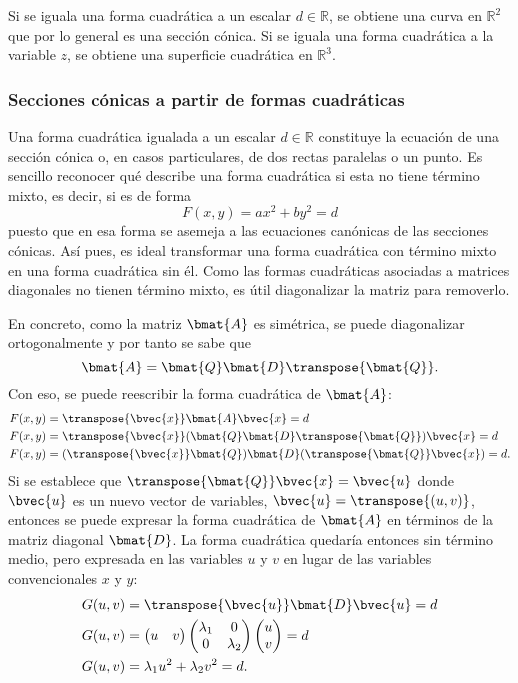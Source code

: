 \documentclass{fmbnotes}
\begin{document}
Si se iguala una forma cuadrática a un escalar \(d \in \mathbb{R}\), se obtiene una curva en \(\mathbb{R}^{2}\) que por lo general es una sección cónica. Si se iguala una forma cuadrática a la variable \(z\), se  obtiene una superficie cuadrática en \(\mathbb{R}^{3}\).

\subsubsection{Secciones cónicas a partir de formas cuadráticas}

Una forma cuadrática igualada a un escalar \(d \in \mathbb{R}\) constituye la ecuación de una sección cónica o, en casos particulares, de dos rectas paralelas o un punto. Es sencillo reconocer qué describe una forma cuadrática si esta no tiene término mixto, es decir, si es de forma 
\[F(x,y)=ax^2+by^2=d\]
puesto que en esa forma se asemeja a las ecuaciones canónicas de las secciones cónicas. Así pues, es ideal transformar una forma cuadrática con término mixto en una forma cuadrática sin él. Como las formas cuadráticas asociadas a matrices diagonales no tienen término mixto, es útil diagonalizar la matriz para removerlo. 

En concreto, como la matriz \(\bmat{A}\) es simétrica, se puede diagonalizar ortogonalmente  y por tanto se sabe que 
\[\bmat{A}=\bmat{Q}\bmat{D}\transpose{\bmat{Q}}.\]
Con eso, se puede reescribir la forma cuadrática de \(\bmat{A}\):  
\begin{align*}
	F(x,y)&=\transpose{\bvec{x}}\bmat{A}\bvec{x} = d \\
	F(x,y) &= \transpose{\bvec{x}}(\bmat{Q}\bmat{D}\transpose{\bmat{Q}})\bvec{x} = d \\
	F(x,y) &= (\transpose{\bvec{x}}\bmat{Q})\bmat{D}(\transpose{\bmat{Q}}\bvec{x}) = d.
\end{align*}
Si se establece que \(\transpose{\bmat{Q}}\bvec{x}=\bvec{u}\) donde \(\bvec{u}\) es un nuevo vector de variables, \(\bvec{u}=\transpose{(u,v)}\), entonces se puede expresar la forma cuadrática de \(\bmat{A}\) en términos de la matriz diagonal \(\bmat{D}\). La forma cuadrática quedaría entonces sin término medio, pero expresada en las variables \(u\) y \(v\) en lugar de las variables convencionales \(x\) y \(y\):
\begin{align}
	G(u,v) &= \transpose{\bvec{u}}\bmat{D}\bvec{u} = d \notag\\
	G(u,v) &=\begin{pmatrix}
					u & v
				\end{pmatrix}\begin{pmatrix}
				\lambda_1 & 0 \\ 0 & \lambda_2 
				\end{pmatrix}\begin{pmatrix}
				u \\ v
				\end{pmatrix} = d\notag\\
	G(u,v) &= \lambda_1 u^2+ \lambda_2 v^2 = d. \label{eq:nueva_forma_cuadratica}
\end{align}
\end{document}

